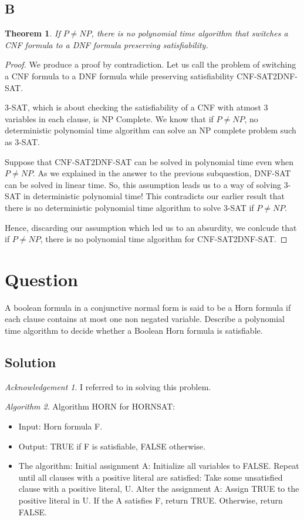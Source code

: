 \documentclass[10pt]{amsart}
\newtheorem{thm}{Theorem}[subsection]
\theoremstyle{remark}
\newtheorem*{ack}{Acknowledgement}
\newtheorem{alg}[thm]{Algorithm}
\begin{document}
\subsection{B} 

\begin{thm}
If $P \neq NP$, there is no polynomial time algorithm that switches a CNF formula to a DNF formula preserving satisfiability.
\end{thm}
\begin{proof}
We produce a proof by contradiction. Let us call the problem of switching a CNF formula to a DNF formula while preserving satisfiability CNF-SAT2DNF-SAT.

3-SAT, which is about checking the satisfiability of a CNF with atmost 3 variables in each clause, is NP Complete. We know that if $P \neq NP$, no deterministic polynomial time algorithm can solve an NP complete problem such as 3-SAT.

Suppose that CNF-SAT2DNF-SAT can be solved in polynomial time even when $P \neq NP$. As we explained in the answer to the previous subquestion, DNF-SAT can be solved in linear time. So, this assumption leads us to a way of solving 3-SAT in deterministic polynomial time! This contradicts our earlier result that there is no deterministic polynomial time algorithm to solve 3-SAT if $P \neq NP$.

Hence, discarding our assumption which led us to an absurdity, we conlcude that if $P \neq NP$, there is no polynomial time algorithm for CNF-SAT2DNF-SAT.
\end{proof}

\section{Question}
A boolean formula in a conjunctive normal form is said to be a Horn formula if each clause contains at most one non negated variable. Describe a polynomial time algorithm to decide whether a Boolean Horn formula is satisfiable.

\subsection{Solution}
\begin{ack}
I referred to \cite{papadimitriouCC} in solving this problem.
\end{ack}

\begin{alg}
Algorithm HORN for HORNSAT:
\begin{itemize}
\item Input: Horn formula F.
\item Output: TRUE if F is satisfiable, FALSE otherwise.
\item The algorithm:
\subitem Initial assignment A: Initialize all variables to FALSE.
\subitem Repeat until all clauses with a positive literal are satisfied:
\subsubitem Take some unsatisfied clause with a positive literal, U.
\subsubitem Alter the assignment A: Assign TRUE to the positive literal in U.
\subitem If the A satisfies F, return TRUE. Otherwise, return FALSE.
\end{itemize}
\end{alg}
\end{document}
